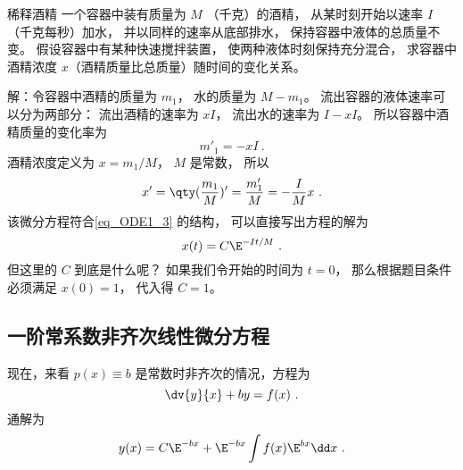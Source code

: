 \begin{example}{稀释酒精}
一个容器中装有质量为 $M$ （千克）的酒精， 从某时刻开始以速率 $I$ （千克每秒）加水， 并以同样的速率从底部排水， 保持容器中液体的总质量不变。 假设容器中有某种快速搅拌装置， 使两种液体时刻保持充分混合， 求容器中酒精浓度 $x$（酒精质量比总质量）随时间的变化关系。

解：令容器中酒精的质量为 $m_1$， 水的质量为 $M - m_1$。 流出容器的液体速率可以分为两部分： 流出酒精的速率为 $xI$， 流出水的速率为 $I - xI$。 所以容器中酒精质量的变化率为
\begin{equation}
m'_1 = -xI~.
\end{equation}
酒精浓度定义为 $x = m_1/M$， $M$ 是常数， 所以
\begin{equation}
x' = \qty(\frac{m_1}{M})' = \frac{m'_1}{M} = -\frac{I}{M}x~.
\end{equation}
该微分方程符合\autoref{eq_ODE1_3} 的结构， 可以直接写出方程的解为
\begin{equation}
x(t) = C\E^{-It/M}~.
\end{equation}
但这里的 $C$ 到底是什么呢？ 如果我们令开始的时间为 $t = 0$， 那么根据题目条件必须满足 $x(0) = 1$， 代入得 $C = 1$。
\end{example}

\subsection{一阶常系数非齐次线性微分方程}
现在，来看 $p(x) \equiv b$ 是常数时非齐次的情况，方程为
\begin{equation}\label{eq_ODE1_4}
\dv{y}{x} + by = f(x)~.
\end{equation}
通解为
\begin{equation}\label{eq_ODE1_13}
y(x)=C\E^{-bx}+\E^{-bx}\int f(x)\E^{bx}\dd x~.
\end{equation}

